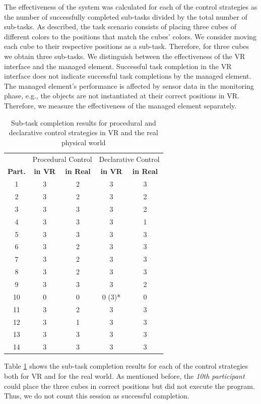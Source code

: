 \documentclass[10pt, conference]{IEEEtran}
\begin{document}
The effectiveness of the system was calculated for each of the control strategies as the number of successfully completed sub-tasks divided by the total number of sub-tasks. As described, the task scenario consists of placing three cubes of different colors to the positions that match the cubes’ colors. We consider moving each cube to their respective positions as a sub-task. Therefore, for three cubes we obtain three sub-tasks. We distinguish between the effectiveness of the VR interface and the managed element. Successful task completion in the VR interface does not indicate successful task completions by the managed element. The managed element's performance is affected by sensor data in the monitoring phase, e.g., the objects are not instantiated at their correct positions in VR. Therefore, we measure the effectiveness of the managed element separately.  

\begin{table}[h!]
\centering
\begin{tabular}{c|cc|cc}
{} &  \multicolumn{2}{c}{Procedural Control} & \multicolumn{2}{c}{Declarative Control}\\
\textbf{Part.} & \textbf{in VR} & \textbf{in Real} & \textbf{in VR} & \textbf{in Real} \\
\hline
1 & 3 & 2 & 3 & 3 \\
2 & 3 & 2 & 3 & 2 \\
3 & 3 & 3 & 3 & 2 \\
4 & 3 & 3 & 3 & 1 \\
5 & 3 & 3 & 3 & 3 \\
6 & 3 & 2 & 3 & 3 \\
7 & 3 & 2 & 3 & 3 \\
8 & 3 & 2 & 3 & 3 \\
9 & 3 & 3 & 3 & 2 \\
10 & 0 & 0 & 0 (3)* & 0 \\
11 & 3 & 2 & 3 & 3 \\
12 & 3 & 1 & 3 & 3 \\
13 & 3 & 3 & 3 & 3 \\
14 & 3 & 3 & 3 & 3 \\
\hline
\end{tabular}
\caption{Sub-task completion results for procedural and declarative control strategies in VR and the real physical world}
\label{effectiveness_records}
\end{table}

Table \ref{effectiveness_records} shows the sub-task completion results for each of the control strategies both for VR and for the real world. As mentioned before, the \textit{10th participant} could place the three cubes in correct positions but did not execute the program. Thus, we do not count this session as successful completion.
\end{document}

